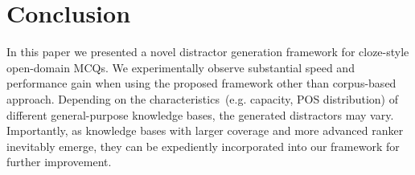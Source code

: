 \section{Conclusion}
\label{sec:conclusion}
In this paper we presented a novel distractor generation framework for cloze-style open-domain MCQs. 
We experimentally observe substantial speed and performance gain when using the proposed framework other than corpus-based approach. Depending on the characteristics~(e.g. capacity, POS distribution) of different general-purpose knowledge bases, the generated distractors may vary. Importantly, as knowledge bases with larger coverage and more advanced ranker inevitably emerge, they can be expediently incorporated into our framework for further improvement.

